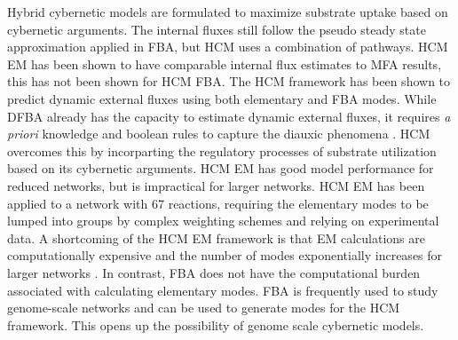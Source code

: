\documentclass[10pt,twocolumn,twoside,final]{IEEEtran}
\begin{document}
Hybrid cybernetic models are formulated to maximize substrate uptake based on cybernetic arguments.
The internal fluxes still follow the pseudo steady state approximation applied in FBA, but HCM uses a combination of pathways.
HCM EM has been shown to have comparable internal flux estimates to MFA results\cite{2008_kim_varner_ramkrishna_BiotechProg}, this has not been shown for HCM FBA.
The HCM framework has been shown to predict dynamic external fluxes using both elementary and FBA modes.
While DFBA already has the capacity to estimate dynamic external fluxes, it requires \textit{a priori} knowledge and boolean rules to capture the diauxic phenomena \cite{1994_varma_palsson_ApplEnvMicro,2002_Mahadevan_BiophysJ,2001_covert_schilling_palsson}.
HCM overcomes this by incorparting the regulatory processes of substrate utilization based on its cybernetic arguments.
HCM EM has good model performance for reduced networks, but is impractical for larger networks.
HCM EM has been applied to a network with 67 reactions, requiring the elementary modes to be lumped into groups by complex weighting schemes and relying on experimental data\cite{2010_song_ramkrishna}.
A shortcoming of the HCM EM framework is that EM calculations are computationally expensive and the number of modes exponentially increases for larger networks \cite{2004_lee_varner_ko_ieee}.
In contrast, FBA does not have the computational burden associated with calculating elementary modes.
FBA is frequently used to study genome-scale networks\cite{2010_orth_NatBiotech} and can be used to generate modes for the HCM framework.
This opens up the possibility of genome scale cybernetic models.

\end{document}
